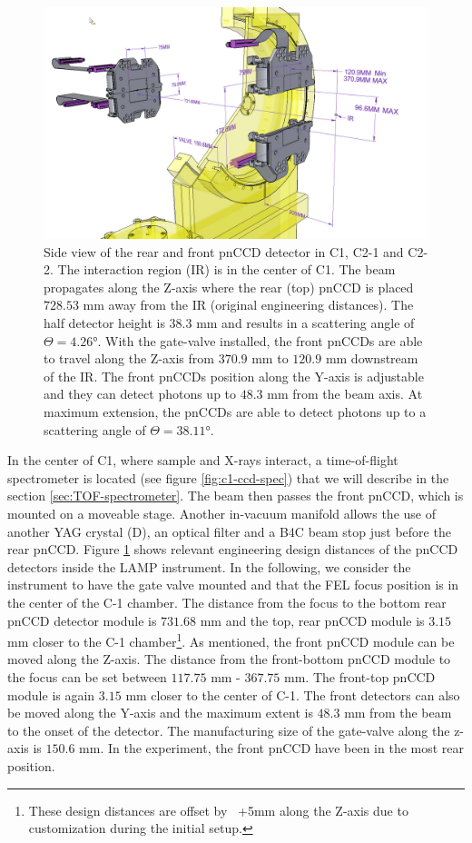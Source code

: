 \begin{figure}
	\centering
		\includegraphics[width=1.00\textwidth]{images/pnCCD-dimensions.jpg}
	\caption[Rear and front pnCCD detector geometry in the LAMP instrument.]{Side view of the rear and front pnCCD detector in C1, C2-1 and C2-2. The interaction region (IR) is in the center of C1. The beam propagates along the Z-axis where the rear (top) pnCCD is placed $728.53$ mm away from the IR (original engineering distances). The half detector height is $38.3$ mm and results in a scattering angle of $\Theta = 4.26$°. With the gate-valve installed, the front pnCCDs are able to travel along the Z-axis from $370.9$ mm to $120.9$ mm downstream of the IR. The front pnCCDs position along the Y-axis is adjustable and they can detect photons up to $48.3$ mm from the beam axis. At maximum extension, the pnCCDs are able to detect photons up to a scattering angle of $\Theta=38.11$°.}
	\label{fig:pnCCD-dimensions}
\end{figure}
In the center of C1, where sample and X-rays interact, a time-of-flight spectrometer is located (see figure \ref{fig:c1-ccd-spec}) that we will describe in the section \ref{sec:TOF-spectrometer}. The beam then passes the front pnCCD, which is mounted on a moveable stage. Another in-vacuum manifold allows the use of another YAG crystal (D), an optical filter and a B4C beam stop just before the rear pnCCD. Figure \ref{fig:pnCCD-dimensions} shows relevant engineering design distances of the pnCCD detectors inside the LAMP instrument. In the following, we consider the instrument to have the gate valve mounted and that the FEL focus position is in the center of the C-1 chamber. The distance from the focus to the bottom rear pnCCD detector module is $731.68$ mm and the top, rear pnCCD module is $3.15$ mm closer to the C-1 chamber\footnote{These design distances are offset by ~+5mm along the Z-axis due to customization during the initial setup.}. As mentioned, the front pnCCD module can be moved along the Z-axis. The distance from the front-bottom pnCCD module to the focus can be set between $117.75$ mm - $367.75$ mm. The front-top pnCCD module is again $3.15$ mm closer to the center of C-1. The front detectors can also be moved along the Y-axis and the maximum extent is $48.3$ mm from the beam to the onset of the detector. The manufacturing size of the gate-valve along the z-axis is $150.6$ mm. In the experiment, the front pnCCD have been in the most rear position.\\
%
%
%
